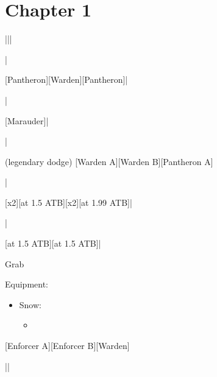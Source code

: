 \section{Chapter 1}

\begin{mainlist}
	\item {}
	\item {} |\skip||\skip
	\item \skip|\skip
	\item {} [Pantheron]\to{}[Warden]\to{}[Pantheron]|\skip
	\item \skip|\skip
	\item {} [Marauder]\to{}|
	\item \skip|\skip
	\item {} (legendary dodge) [Warden A]\to{}[Warden B]\to{}[Pantheron A]
	\item \skip|\skip
	\item {} \to{}[x2]\to{}[at 1.5 ATB]\to{}[x2]\to{}[at 1.99 ATB]\to{}|\skip
	\item \save|\skip
	\item {} [at 1.5 ATB]\to{}\to{}\to{}[at 1.5 ATB]\to{}\to{}\to{}|
	\item Grab 
\end{mainlist}

\begin{menu}
	\item Equipment:
	\begin{itemize}
		\item Snow:
		\begin{itemize}
			\item {}
		\end{itemize}
	\end{itemize}
\end{menu}

\begin{mainlist}
	\item \skip
	\item {} [Enforcer A]\to{}[Enforcer B]\to{}[Warden]
	\item {}|\skip|\save
\end{mainlist}
